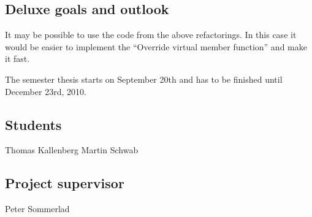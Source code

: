 \documentclass[a4paper,10pt]{scrreprt}
\begin{document}
\subsection*{Deluxe goals and outlook}
It may be possible to use the code from the above refactorings. In this case it would be easier to implement the ``Override virtual member function'' and make it fast. \newline

The semester thesis starts on September 20th and has to be finished until
December 23rd, 2010.

\subsection*{Students}
Thomas Kallenberg \dotfill
Martin Schwab \dotfill
\subsection*{Project supervisor}
Peter Sommerlad \dotfill
~ \newline 
\end{document}
